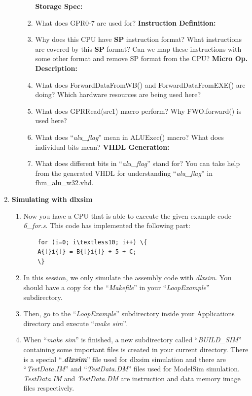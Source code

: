 \begin{enumerate}
\begin{enumerate}
\begin{enumerate}[label=(\alph*)]
		\newline\textbf{Storage Spec:}
		\color{red}\item\normalcolor What does GPR0-7 are used for?
		\newline\textbf{Instruction Definition:}
		\color{red}\item\normalcolor Why does this CPU have \textbf{SP} instruction format? What instructions are covered by this \textbf{SP} format? Can we map these instructions with some other format and remove SP format from the CPU?
		\newline\textbf{Micro Op. Description:}
		\color{red}\item\normalcolor What does ForwardDataFromWB() and ForwardDataFromEXE() are doing? Which hardware resources are being used here?
		\color{red}\item\normalcolor What does GPRRead(src1) macro perform? Why FWO.forward() is used here?
		\color{red}\item\normalcolor What does ``\emph{alu\_flag}'' mean in ALUExec() macro? What does individual bits mean?
		\newline\textbf{VHDL Generation:}
		\color{red}\item\normalcolor What does different bits in ``\emph{alu\_flag}'' stand for? You can take help from the generated VHDL for understanding ``\emph{alu\_flag}'' in fhm\_alu\_w32.vhd.
		\end{enumerate}
	\end{enumerate}
\item \textbf{Simulating with dlxsim}
	\begin{enumerate}
	\item Now you have a CPU that is able to execute the given example code \emph{6\_for.s}. This code has implemented the following part:
	\begin{lstlisting}
	for (i=0; i\textless10; i++) \{
	A{[}i{]} = B{[}i{]} + 5 + C;
	\}
	\end{lstlisting}
	\item In this session, we only simulate the assembly code with \emph{dlxsim}. You should have a copy for the ``\emph{Makefile}'' in your ``\emph{LoopExample}'' subdirectory.
	\item Then, go to the ``\emph{LoopExample}'' subdirectory inside your Applications directory and execute ``\emph{make sim}''. 
	\item When ``\emph{make sim}'' is finished, a new subdirectory called ``\emph{BUILD\_SIM}'' containing some important files is created in your current directory. There is a special ``\emph{.\textbf{dlxsim}}'' file used for dlxsim simulation and there are ``\emph{TestData.IM}'' and ``\emph{TestData.DM}'' files used for ModelSim simulation. \emph{TestData.IM} and \emph{TestData.DM} are instruction and data memory image files respectively.

\end{enumerate}
\end{enumerate}
